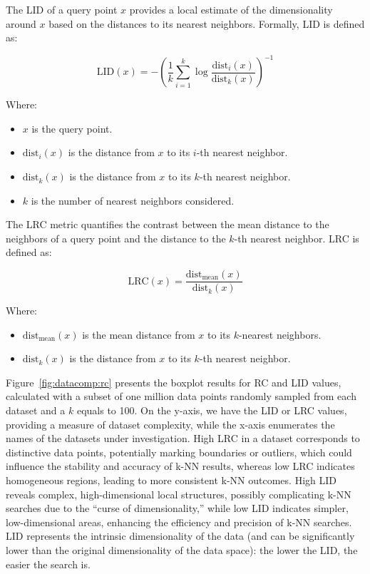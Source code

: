  The LID of a query point \( x \) provides a local estimate of the dimensionality around \( x \) based on the distances to its nearest neighbors. Formally, LID is defined as:

\begin{equation}
    \text{LID}(x) = -\left(\frac{1}{k} \sum_{i=1}^{k} \log \frac{\text{dist}_i(x)}{\text{dist}_k(x)}\right)^{-1}
    \label{eq:lid}
\end{equation}

Where:
\begin{itemize}
    \item \( x \) is the query point.
    \item \( \text{dist}_i(x) \) is the distance from \( x \) to its \( i \)-th nearest neighbor.
    \item \( \text{dist}_k(x) \) is the distance from \( x \) to its \( k \)-th nearest neighbor.
    \item \( k \) is the number of nearest neighbors considered.
\end{itemize}

 The LRC metric quantifies the contrast between the mean distance to the neighbors of a query point and the distance to the \( k \)-th nearest neighbor. LRC is defined as:

\begin{equation}
    \text{LRC}(x) = \frac{\text{dist}_{\text{mean}}(x)}{\text{dist}_k(x)}
    \label{eq:lrc}
\end{equation}

Where:
\begin{itemize}
    \item \( \text{dist}_{\text{mean}}(x) \) is the mean distance from \( x \) to its \( k \)-nearest neighbors.
    \item \( \text{dist}_k(x) \) is the distance from \( x \) to its \( k \)-th nearest neighbor.
\end{itemize}

Figure~\ref{fig:datacomp:rc} presents the boxplot results for RC and LID values, calculated with a subset of one million data points randomly sampled from each dataset and a $k$ equals to 100. On the y-axis, we have the LID or LRC values, providing a measure of dataset complexity, while the x-axis enumerates the names of the datasets under investigation. High LRC in a dataset corresponds to distinctive data points, potentially marking boundaries or outliers, which could influence the stability and accuracy of k-NN results, whereas low LRC indicates homogeneous regions, leading to more consistent k-NN outcomes. 
High LID reveals complex, high-dimensional local structures, possibly complicating k-NN searches due to the “curse of dimensionality,” while low LID indicates simpler, low-dimensional areas, enhancing the efficiency and precision of k-NN searches. 
LID represents the intrinsic dimensionality of the data (and can be significantly lower than the original dimensionality of the data space): the lower the LID, the easier the search is.

